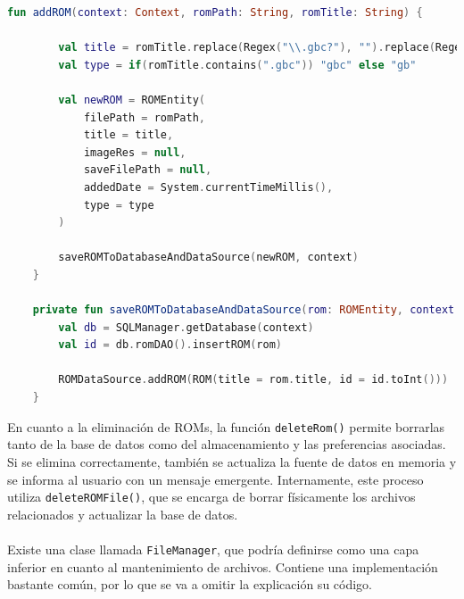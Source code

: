 \begin{lstlisting}[language=Kotlin, caption={ROM Management - Añadir una ROM.}, label={code:romManagementAddRom}]
    fun addROM(context: Context, romPath: String, romTitle: String) {

        val title = romTitle.replace(Regex("\\.gbc?"), "").replace(Regex("_"), " ")
        val type = if(romTitle.contains(".gbc")) "gbc" else "gb"

        val newROM = ROMEntity(
            filePath = romPath,
            title = title,
            imageRes = null,
            saveFilePath = null,
            addedDate = System.currentTimeMillis(),
            type = type
        )

        saveROMToDatabaseAndDataSource(newROM, context)
    }

    private fun saveROMToDatabaseAndDataSource(rom: ROMEntity, context: Context) {
        val db = SQLManager.getDatabase(context)
        val id = db.romDAO().insertROM(rom)

        ROMDataSource.addROM(ROM(title = rom.title, id = id.toInt()))
    }
\end{lstlisting}

En cuanto a la eliminación de ROMs, la función \texttt{deleteRom()} permite borrarlas tanto de la base de datos como del almacenamiento y las preferencias asociadas. Si se elimina correctamente, también se actualiza la fuente de datos en memoria y se informa al usuario con un mensaje emergente. Internamente, este proceso utiliza \texttt{deleteROMFile()}, que se encarga de borrar físicamente los archivos relacionados y actualizar la base de datos.
\\\\
Existe una clase llamada \texttt{FileManager}, que podría definirse como una capa inferior en cuanto al mantenimiento de archivos. Contiene una implementación bastante común, por lo que se va a omitir la explicación su código.

